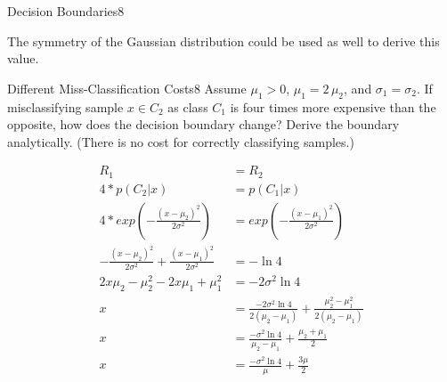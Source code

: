 \begin{questions}
\begin{question}{Decision Boundaries}{8}
\begin{answer}
	The symmetry of the Gaussian distribution could be used as well to derive this value.
\end{answer}

\end{question}


\begin{question}{Different Miss-Classification Costs}{8}
Assume $\mu_1 > 0$, $\mu_1 = 2\, \mu_2$, and $\sigma_1=\sigma_2$. If misclassifying sample $x \in C_2$ as class $C_1$ is four times more expensive than the opposite, how does the decision boundary change? Derive the boundary analytically.
(There is no cost for correctly classifying samples.)

\begin{answer}

\begin{align*}
R_1 &= R_2\\
4 * p(C_2|x) & = p(C_1|x)\\
4 * exp(- \frac{(x-\mu_2)^2}{2 \sigma ^2}) &= exp(- \frac{(x-\mu_1)^2}{2 \sigma ^2})\\
- \frac{(x-\mu_2)^2}{2 \sigma ^2} + \frac{(x-\mu_1)^2}{2 \sigma ^2} &= -\ln{4}\\
2x\mu_2 - \mu_2^2 - 2x\mu_1 + \mu_1^2 &= -2\sigma^2 \ln{4}\\
x &=\frac{-2\sigma^2 \ln{4}}{2(\mu_2 - \mu_1)} + \frac{\mu_2^2 - \mu_1^2}{2(\mu_2 - \mu_1)}\\
x &=\frac{-\sigma^2 \ln{4}}{\mu_2 - \mu_1} + \frac{\mu_2 + \mu_1}{2}\\
x &=\frac{-\sigma^2 \ln{4}}{\mu} + \frac{3\mu}{2}\\
\end{align*}

\end{answer}

\end{question}


\end{questions}
